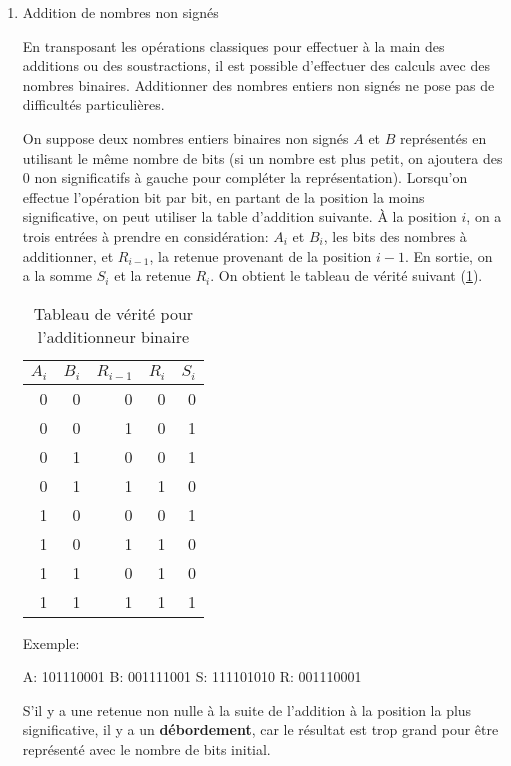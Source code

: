 \documentclass[letter, oneside]{book}
\begin{document}
\begin{enumerate}
\item Addition de nombres non signés
\label{sec:orgd11d57b}

En transposant les opérations classiques pour effectuer à la main des
additions ou des soustractions, il est possible d'effectuer des
calculs avec des nombres binaires. Additionner des nombres entiers non
signés ne pose pas de difficultés particulières.

On suppose deux nombres entiers binaires non signés \(A\) et \(B\)
représentés en utilisant le même nombre de bits (si un nombre est plus
petit, on ajoutera des 0 non significatifs à gauche pour compléter la
représentation). Lorsqu'on effectue l'opération bit par bit, en
partant de la position la moins significative, on peut utiliser la
table d'addition suivante. À la position \(i\), on a trois entrées à
prendre en considération: \(A_{i}\) et \(B_{i}\), les bits des nombres
à additionner, et \(R_{i-1}\), la retenue provenant de la position
\(i-1\). En sortie, on a la somme \(S_{i}\) et la retenue \(R_{i}\).
On obtient le tableau de vérité suivant (\ref{tab:org6ceb2dc}).

\begin{table}[htbp]
\caption{\label{tab:org6ceb2dc}Tableau de vérité pour l'additionneur binaire}
\centering
\begin{tabular}{rrrrr}
\(A_{i}\) & \(B_{i}\) & \(R_{i-1}\) & \(R_{i}\) & \(S_{i}\)\\[0pt]
\hline
0 & 0 & 0 & 0 & 0\\[0pt]
0 & 0 & 1 & 0 & 1\\[0pt]
0 & 1 & 0 & 0 & 1\\[0pt]
0 & 1 & 1 & 1 & 0\\[0pt]
1 & 0 & 0 & 0 & 1\\[0pt]
1 & 0 & 1 & 1 & 0\\[0pt]
1 & 1 & 0 & 1 & 0\\[0pt]
1 & 1 & 1 & 1 & 1\\[0pt]
\end{tabular}
\end{table}


Exemple:

A: 101110001
B: 001111001
S: 111101010
R: 001110001

S'il y a une retenue non nulle à la suite de l'addition à la position
la plus significative, il y a un \textbf{débordement}, car le résultat est trop
grand pour être représenté avec le nombre de bits initial.


\end{enumerate}
\end{document}
